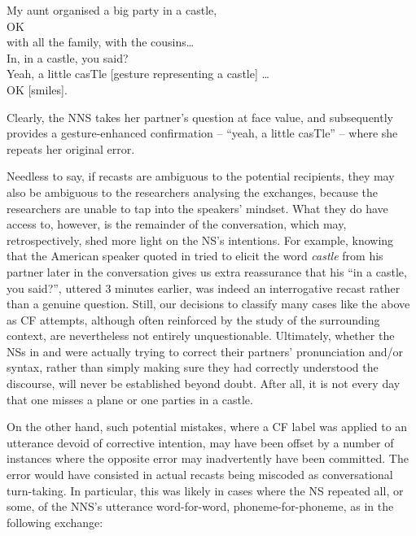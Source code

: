 \documentclass[output=paper,colorlinks,citecolor=brown,modfonts,nonflat]{../langscibook}
\begin{document}
\ea\label{ex:scheuer:9}
{\NNS} {My} {aunt} {organised} {a} {big} {party} {in} {a} {castle,}\\
{\NS} {OK}\\
{\NNS} {with} {all} {the} {family,} {with} {the} {cousins…}\\
{\NS} {In,} {in} {a} {castle,} {you} {said?}\\
{\NNS} {Yeah,} {a} {little} {casTle} [gesture representing a castle] {…}\\
{\NS} {OK} [smiles].
\z

Clearly, the NNS takes her partner’s question at face value, and subsequently provides a gesture-enhanced confirmation – “yeah, a little casTle” – where she repeats her original error. 



Needless to say, if recasts are ambiguous to the potential recipients, they may also be ambiguous to the researchers analysing the exchanges, because the researchers are unable to tap into the speakers’ mindset. What they do have access to, however, is the remainder of the conversation, which may, retrospectively, shed more light on the NS’s intentions. For example, knowing that the American speaker quoted in  tried to elicit the word \textit{castle} from his partner later in the conversation gives us extra reassurance that his “in a castle, you said?”, uttered 3 minutes earlier, was indeed an interrogative recast rather than a genuine question. Still, our decisions to classify many cases like the above as CF attempts, although often reinforced by the study of the surrounding context, are nevertheless not entirely unquestionable. Ultimately, whether the NSs in  and  were actually trying to correct their partners’ pronunciation and/or syntax, rather than simply making sure they had correctly understood the discourse, will never be established beyond doubt. After all, it is not every day that one misses a plane or one parties in a castle.


\largerpage
On the other hand, such potential mistakes, where a CF label was applied to an utterance devoid of corrective intention, may have been offset by a number of instances where the opposite error may inadvertently have been committed. The error would have consisted in actual recasts being miscoded as conversational turn-taking. In particular, this was likely in cases where the NS repeated all, or some, of the NNS’s utterance word-for-word, phoneme-for-phoneme, as in the following exchange:
\end{document}
